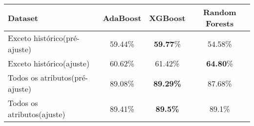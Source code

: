 \documentclass[  
convert={
    size=4000x2000,
    outext=.png
  },
]{standalone}
\begin{document}
\begin{tabular}{lccc} %
\toprule
Dataset & AdaBoost & XGBoost & Random Forests\\
\midrule
\rowcolor{black!20} Exceto histórico(pré-ajuste) & 59.44\% & \textbf{59.77}\% & 54.58\%\\
Exceto histórico(ajuste) & 60.62\% & 61.42\% & \textbf{64.80}\%\\
\rowcolor{black!20} Todos os atributos(pré-ajuste) & 89.08\% & \textbf{89.29\%} & 87.68\%\\
Todos os atributos(ajuste) & 89.41\% & \textbf{89.5\%} & 89.1\% \\
\midrule[\heavyrulewidth]
\end{tabular}
\end{document}
